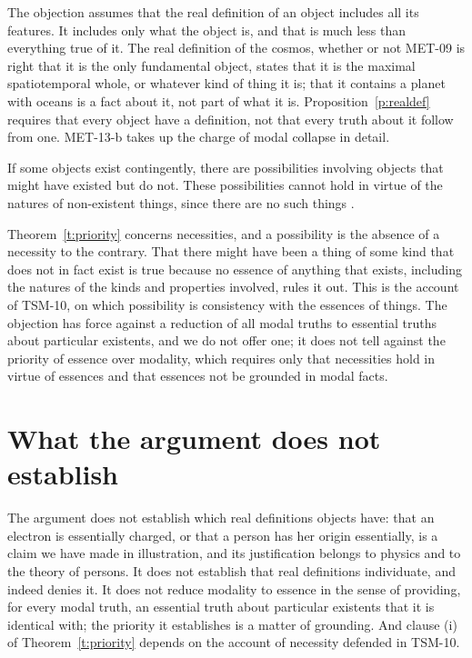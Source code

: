 \documentclass{situationist-preprint}
\begin{document}
\begin{reply}
The objection assumes that the real definition of an object includes all its features. It includes only what the object is, and that is much less than everything true of it. The real definition of the cosmos, whether or not MET-09 is right that it is the only fundamental object, states that it is the maximal spatiotemporal whole, or whatever kind of thing it is; that it contains a planet with oceans is a fact about it, not part of what it is. Proposition~\ref{p:realdef} requires that every object have a definition, not that every truth about it follow from one. MET-13-b takes up the charge of modal collapse in detail.
\end{reply}

\begin{objection}\label{o:teitel}
If some objects exist contingently, there are possibilities involving objects that might have existed but do not. These possibilities cannot hold in virtue of the natures of non-existent things, since there are no such things \citep{Teitel2019}.
\end{objection}

\begin{reply}
Theorem~\ref{t:priority} concerns necessities, and a possibility is the absence of a necessity to the contrary. That there might have been a thing of some kind that does not in fact exist is true because no essence of anything that exists, including the natures of the kinds and properties involved, rules it out. This is the account of TSM-10, on which possibility is consistency with the essences of things. The objection has force against a reduction of all modal truths to essential truths about particular existents, and we do not offer one; it does not tell against the priority of essence over modality, which requires only that necessities hold in virtue of essences and that essences not be grounded in modal facts.
\end{reply}

\section{What the argument does not establish}\label{s:limits}

The argument does not establish which real definitions objects have: that an electron is essentially charged, or that a person has her origin essentially, is a claim we have made in illustration, and its justification belongs to physics and to the theory of persons. It does not establish that real definitions individuate, and indeed denies it. It does not reduce modality to essence in the sense of providing, for every modal truth, an essential truth about particular existents that it is identical with; the priority it establishes is a matter of grounding. And clause (i) of Theorem~\ref{t:priority} depends on the account of necessity defended in TSM-10.
\end{document}
